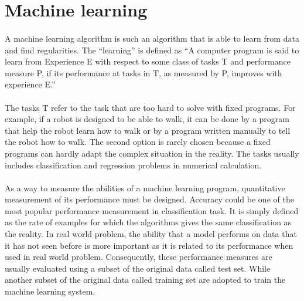 \section{Machine learning}
\label{lr_sec:machine_learning}
\paragraph{}
A machine learning algorithm is such an algorithm that is able to learn from data and find regularities.
The ``learning'' is defined as ``A computer program is said to learn from Experience E with respect to some class of tasks T and performance measure P, if its performance at tasks in T, as measured by P, improves with experience E.'' \cite{Mitchell:1997:ML:541177}
\paragraph{}
The tasks T refer to the task that are too hard to solve with fixed programs.
For example, if a robot is designed to be able to walk, it can be done by a program that help the robot learn how to walk or by a program written manually to tell the robot how to walk.
The second option is rarely chosen because a fixed programs can hardly adapt the complex situation in the reality.
The tasks usually includes classification and regression problems in numerical calculation.

\paragraph{}
As a way to measure the abilities of a machine learning program, quantitative measurement of its performance must be designed.
Accuracy could be one of the most popular performance measurement in classification task.
It is simply defined as the rate of examples for which the algorithms gives the same classification as the reality.
In real world problem, the ability that a model performs on data that it has not seen before is more important as it is related to its performance when used in real world problem.
Consequently, these performance measures are usually evaluated using a subset of the original data called test set.
While another subset of the original data called training set are adopted to train the machine learning system.

